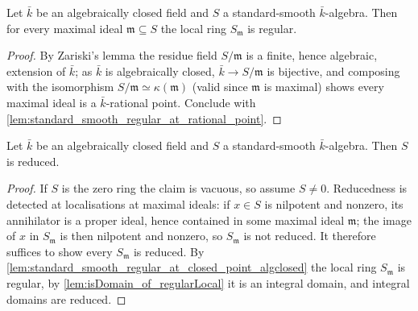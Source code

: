 \begin{lemma}
  \label{lem:standard_smooth_regular_at_closed_point_algclosed}
  Let \(\bar k\) be an algebraically closed field and \(S\) a standard-smooth
  \(\bar k\)-algebra. Then for every maximal ideal \(\mathfrak m \subseteq S\)
  the local ring \(S_{\mathfrak m}\) is regular.
\end{lemma}

\begin{proof}
  By Zariski's lemma the residue field \(S/\mathfrak m\) is a finite, hence
  algebraic, extension of \(\bar k\); as \(\bar k\) is algebraically closed,
  \(\bar k \to S/\mathfrak m\) is bijective, and composing with the
  isomorphism \(S/\mathfrak m \simeq \kappa(\mathfrak m)\) (valid since
  \(\mathfrak m\) is maximal) shows every maximal ideal is a
  \(\bar k\)-rational point. Conclude with
  \cref{lem:standard_smooth_regular_at_rational_point}.
\end{proof}

\begin{lemma}
  \label{lem:standard_smooth_reduced_algclosed}
  Let \(\bar k\) be an algebraically closed field and \(S\) a standard-smooth
  \(\bar k\)-algebra. Then \(S\) is reduced.
\end{lemma}

\begin{proof}
  If \(S\) is the zero ring the claim is vacuous, so assume \(S \neq 0\).
  Reducedness is detected at localisations at maximal ideals: if \(x \in S\) is
  nilpotent and nonzero, its annihilator is a proper ideal, hence contained in
  some maximal ideal \(\mathfrak m\); the image of \(x\) in \(S_{\mathfrak m}\)
  is then nilpotent and nonzero, so \(S_{\mathfrak m}\) is not reduced. It
  therefore suffices to show every \(S_{\mathfrak m}\) is reduced. By
  \cref{lem:standard_smooth_regular_at_closed_point_algclosed} the local ring
  \(S_{\mathfrak m}\) is regular, by \cref{lem:isDomain_of_regularLocal} it is
  an integral domain, and integral domains are reduced.
\end{proof}

